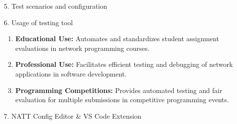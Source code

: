 \documentclass[final]{beamer}
\newlength{\colwidth}
\begin{document}
\begin{frame}[t]
\begin{columns}[t]
\begin{column}{\colwidth}
\begin{block}{5. Test scenarios and configuration}
  \end{block}

  \begin{exampleblock}{6. Usage of testing tool}

    \begin{enumerate}
      \item \textbf{Educational Use:} Automates and standardizes student assignment evaluations in network programming courses.
      
      \item \textbf{Professional Use:} Facilitates efficient testing and debugging of network applications in software development.
      
      \item \textbf{Programming Competitions:} Provides automated testing and fair evaluation for multiple submissions in competitive programming events.
   \end{enumerate}
 
  \end{exampleblock}

  \begin{block}{7. NATT Config Editor \& VS Code Extension}


\end{block}
\end{column}
\end{columns}
\end{frame}
\end{document}
